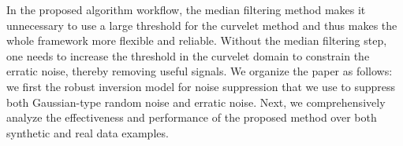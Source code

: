 In the proposed algorithm workflow, the  median filtering method makes it unnecessary to use a large threshold for the curvelet method and thus makes the whole framework more flexible and reliable. Without the median filtering step, one needs to increase the threshold in the curvelet domain to constrain the erratic noise, thereby removing useful signals. We organize the paper as follows: we first  the robust inversion model for noise suppression that we use to suppress both Gaussian-type random noise and erratic noise.  Next, we comprehensively analyze the effectiveness and performance of the proposed method over both synthetic and real data examples.
